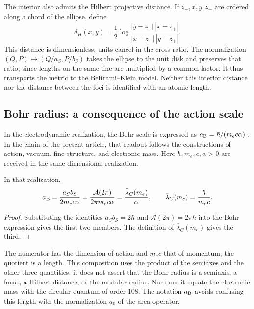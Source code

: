 The interior also admits the Hilbert projective distance. If
\(z_-,x,y,z_+\) are ordered along a chord of the ellipse, define
\[
 d_H(x,y)=\frac12\log
 \frac{|y-z_-|\,|x-z_+|}{|x-z_-|\,|y-z_+|}.
\]
This distance is dimensionless: units cancel in the cross-ratio.
The normalization \((Q,P)\mapsto(Q/a_S,P/b_S)\) takes the ellipse
to the unit disk and preserves that ratio, since lengths on the
same line are multiplied by a common factor. It thus transports the metric
to the Beltrami--Klein model. Neither this interior distance nor the distance
between the foci is identified with an atomic length.

\subsection{Bohr radius: a consequence of the action scale}
\label{sec:ii-elipse-bohr}

In the electrodynamic realization, the Bohr scale is expressed as
\(a_{\rm B}=\hbar/(m_ec\alpha)\) \cite{codata2022}. In the chain
of the present article, that readout follows the constructions of
action, vacuum, fine structure, and electronic mass. Here
\(\hbar,m_e,c,\alpha>0\) are received in the same dimensional realization.
\begin{proposition}
\label{prop:ii-elipse-bohr}
In that realization,
\begin{equation}
 a_{\rm B}=\frac{a_Sb_S}{2m_ec\alpha}
 =\frac{\mathcal A(2\pi)}{2\pi m_ec\alpha}
 =\frac{\bar\lambda_C(m_e)}{\alpha},\qquad
 \bar\lambda_C(m_e)=\frac{\hbar}{m_ec}.
 \label{eq:ii-elipse-bohr}
\end{equation}
\end{proposition}
\begin{proof}
Substituting the identities \(a_Sb_S=2\hbar\) and
\(\mathcal A(2\pi)=2\pi\hbar\) into the Bohr expression
gives the first two members. The definition of
\(\bar\lambda_C(m_e)\) gives the third.
\end{proof}

The numerator has the dimension of action and \(m_ec\) that of momentum;
the quotient is a length. This composition uses the product of the
semiaxes and the other three quantities: it does not assert that the Bohr radius is a semiaxis,
a focus, a Hilbert distance, or the modular radius. Nor does it equate
the electronic mass with the circular quantum of order 108. The notation
\(a_{\rm B}\) avoids confusing this length with the normalization
\(a_0\) of the area operator.

